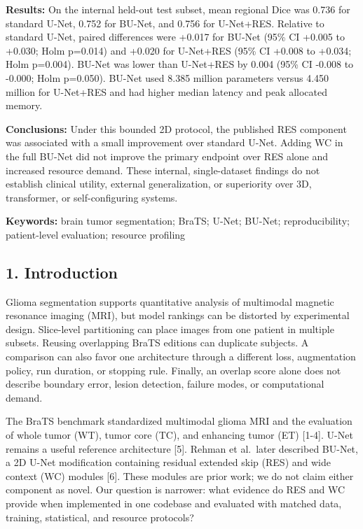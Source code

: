\documentclass[
  10pt,
  letterpaper,
]{article}
\begin{document}
\textbf{Results:} On the internal held-out test subset, mean regional
Dice was 0.736 for standard U-Net, 0.752 for BU-Net, and 0.756 for
U-Net+RES. Relative to standard U-Net, paired differences were +0.017
for BU-Net (95\% CI +0.005 to +0.030; Holm p=0.014) and +0.020 for
U-Net+RES (95\% CI +0.008 to +0.034; Holm p=0.004). BU-Net was lower
than U-Net+RES by 0.004 (95\% CI -0.008 to -0.000; Holm p=0.050). BU-Net
used 8.385 million parameters versus 4.450 million for U-Net+RES and had
higher median latency and peak allocated memory.

\textbf{Conclusions:} Under this bounded 2D protocol, the published RES
component was associated with a small improvement over standard U-Net.
Adding WC in the full BU-Net did not improve the primary endpoint over
RES alone and increased resource demand. These internal, single-dataset
findings do not establish clinical utility, external generalization, or
superiority over 3D, transformer, or self-configuring systems.

\textbf{Keywords:} brain tumor segmentation; BraTS; U-Net; BU-Net;
reproducibility; patient-level evaluation; resource profiling

\pagebreak

\subsection{1. Introduction}\label{introduction}

Glioma segmentation supports quantitative analysis of multimodal
magnetic resonance imaging (MRI), but model rankings can be distorted by
experimental design. Slice-level partitioning can place images from one
patient in multiple subsets. Reusing overlapping BraTS editions can
duplicate subjects. A comparison can also favor one architecture through
a different loss, augmentation policy, run duration, or stopping rule.
Finally, an overlap score alone does not describe boundary error, lesion
detection, failure modes, or computational demand.

The BraTS benchmark standardized multimodal glioma MRI and the
evaluation of whole tumor (WT), tumor core (TC), and enhancing tumor
(ET) {[}1-4{]}. U-Net remains a useful reference architecture {[}5{]}.
Rehman et al.~later described BU-Net, a 2D U-Net modification containing
residual extended skip (RES) and wide context (WC) modules {[}6{]}.
These modules are prior work; we do not claim either component as novel.
Our question is narrower: what evidence do RES and WC provide when
implemented in one codebase and evaluated with matched data, training,
statistical, and resource protocols?
\end{document}
